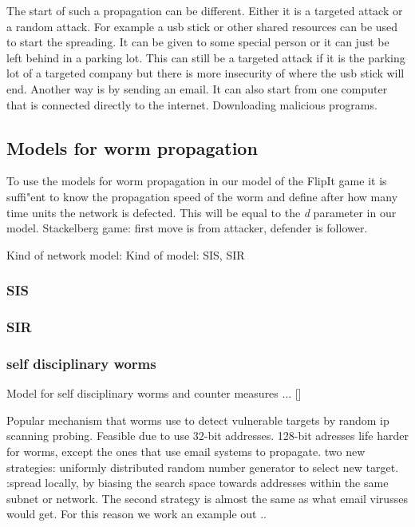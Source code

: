 The start of such a propagation can be different. Either it is a targeted attack or a random attack. For example a usb stick or other shared resources can be used to start the spreading. It can be given to some special person or it can just be left behind in a parking lot. This can still be a targeted attack if it is the parking lot of a targeted company but there is more insecurity of where the usb stick will end. Another way is by sending an email. It can also start from one computer that is connected directly to the internet. Downloading malicious programs. 

\subsection*{Models for worm propagation}
To use the models for worm propagation in our model of the FlipIt game it is suffi"ent to know the propagation speed of the worm and define after how many time units the network is defected. This will be equal to the \textit{d} parameter in our model.  
Stackelberg game: first move is from attacker, defender is follower. 

Kind of network model: 
Kind of model: SIS, SIR

\subsubsection*{SIS}

\subsubsection*{SIR}

\subsubsection*{self disciplinary worms}
Model for self disciplinary worms and counter measures ... []

Popular mechanism that worms use to detect vulnerable targets by random ip scanning probing. Feasible due to use 32-bit addresses. 128-bit adresses life harder for worms, except the ones that use email systems to propagate. two new strategies: uniformly distributed random number generator to select new target. :spread locally, by biasing the search space towards addresses within the same subnet or network. 
The second strategy is almost the same as what email virusses would get. For this reason we work an example out .. 




